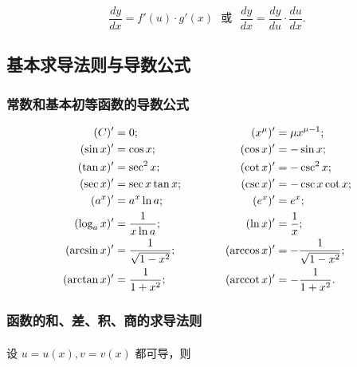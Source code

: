 \begin{equation}
\frac{dy}{dx} = f'(u) \cdot g'(x) \text{~~或~~} \frac{dy}{dx} = \frac{dy}{du} \cdot \frac{du}{dx}.
\end{equation}

\subsection{基本求导法则与导数公式}
\subsubsection{常数和基本初等函数的导数公式}

\begin{equation}
  \begin{aligned}[c]
    (C)' &= 0; \\
    (\sin x)' &= \cos x; \\
    (\tan x)' &= \sec^2 x; \\
    (\sec x)' &= \sec x \tan x; \\
    (a^x)' &= a^x\ln a; \\
    (\log_a x)' &= \frac{1}{x \ln a}; \\
    (\arcsin x)' &= \frac{1}{\sqrt{1 - x^2}}; \\
    (\arctan x)' &= \frac{1}{1 + x^2};
  \end{aligned}
  \qquad \qquad
  \begin{aligned}[c]
    (x^\mu)' &= \mu x^{\mu - 1}; \\
    (\cos x)' &= -\sin x; \\
    (\cot x)' &= - \csc^2 x; \\
    (\csc x)' &= -\csc x \cot x; \\
    (e^x)' &= e^x; \\
    (\ln x)' &= \frac{1}{x}; \\
    (\arccos x)' &= - \frac{1}{\sqrt{1 - x^2}}; \\
    (\operatorname{arccot} x)' &= - \frac{1}{1 + x^2}.
  \end{aligned}
\end{equation}

\subsubsection{函数的和、差、积、商的求导法则}
\paragraph{}
设 $u = u(x), v = v(x)$ 都可导，则

